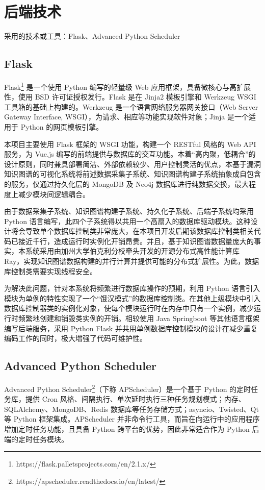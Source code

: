 \documentclass[a4paper,AutoFakeBold,oneside,12pt]{book}
\begin{document}
\section{后端技术}

采用的技术或工具：Flask、Advanced Python Scheduler

\subsection{Flask}

Flask\footnote{https://flask.palletsprojects.com/en/2.1.x/} 是一个使用 Python 编写的轻量级 Web 应用框架，具备微核心与高扩展性，使用 BSD 许可证授权发行。Flask 是在 Jinja2 模板引擎和 Werkzeug WSGI 工具箱的基础上构建的。Werkzeug 是一个语言网络服务器网关接口（Web Server Gateway Interface, WSGI），为请求、相应等功能实现软件对象；Jinja 是一个适用于 Python 的网页模板引擎。

本项目主要使用 Flask 框架的 WSGI 功能，构建一个 RESTful 风格的 Web API 服务，为 Vue.js 编写的前端提供与数据库的交互功能。本着``高内聚，低耦合''的设计原则，同时兼具部署简洁、外部依赖较少、用户控制灵活的优点，本基于漏洞知识图谱的可视化系统将前述数据采集子系统、知识图谱构建子系统抽象成自包含的服务，仅通过持久化层的 MongoDB 及 Neo4j 数据库进行纯数据交换，最大程度上减少模块间逻辑耦合。

由于数据采集子系统、知识图谱构建子系统、持久化子系统、后端子系统均采用 Python 语言编写，此四个子系统得以共用一个高扇入的数据库驱动模块。这种设计将会导致单个数据库控制类非常庞大，在本项目开发后期该数据库控制类相关代码已接近千行，造成运行时实例化开销昂贵。并且，基于知识图谱数据量庞大的事实，本系统采用由加州大学伯克利分校牵头开发的开源分布式高性能计算库 Ray，实现知识图谱数据构建的并行计算并提供可能的分布式扩展性。为此，数据库控制类需要实现线程安全。

为解决此问题，针对本系统将频繁进行数据库操作的预期，利用 Python 语言引入模块为单例的特性实现了一个``饿汉模式''的数据库控制类。在其他上级模块中引入数据库控制器类的实例化对象，使每个模块运行时在内存中只有一个实例，减少运行时频繁地创建和销毁类实例的开销。相较使用 Java Springboot 等其他语言框架编写后端服务，采用 Python Flask 并共用单例数据库控制模块的设计在减少重复编码工作的同时，极大增强了代码可维护性。

\subsection{Advanced Python Scheduler}

Advanced Python Scheduler\footnote{https://apscheduler.readthedocs.io/en/latest/}（下称 APScheduler）是一个基于 Python 的定时任务库，提供 Cron 风格、间隔执行、单次延时执行三种任务规划模式；内存、SQLAlchemy、MongoDB、Redis 数据库等任务存储方式；asyncio、Twisted、Qt 等 Python 框架集成。APScheduler 并非命令行工具，而旨在向运行中的应用程序增加定时任务功能，且具备 Python 跨平台的优势，因此非常适合作为 Python 后端的定时任务模块。
\end{document}
